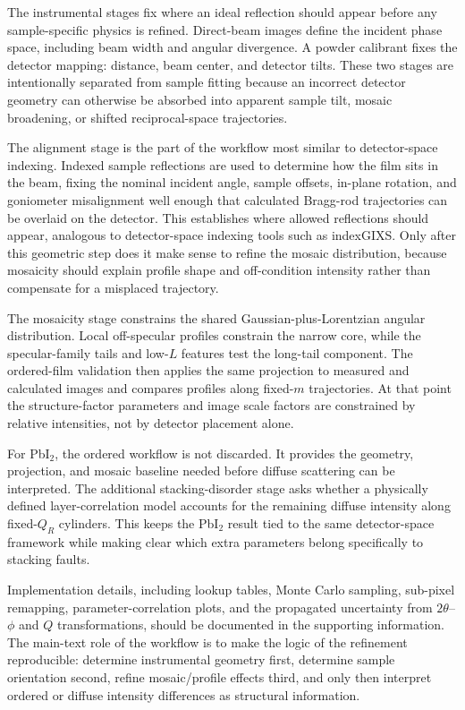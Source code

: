 The instrumental stages fix where an ideal reflection should appear before any sample-specific physics is refined. Direct-beam images define the incident phase space, including beam width and angular divergence. A powder calibrant fixes the detector mapping: distance, beam center, and detector tilts. These two stages are intentionally separated from sample fitting because an incorrect detector geometry can otherwise be absorbed into apparent sample tilt, mosaic broadening, or shifted reciprocal-space trajectories.

The alignment stage is the part of the workflow most similar to detector-space indexing. Indexed sample reflections are used to determine how the film sits in the beam, fixing the nominal incident angle, sample offsets, in-plane rotation, and goniometer misalignment well enough that calculated Bragg-rod trajectories can be overlaid on the detector. This establishes where allowed reflections should appear, analogous to detector-space indexing tools such as indexGIXS.\cite{SmilgiesLi2026IndexGIXS} Only after this geometric step does it make sense to refine the mosaic distribution, because mosaicity should explain profile shape and off-condition intensity rather than compensate for a misplaced trajectory.

The mosaicity stage constrains the shared Gaussian-plus-Lorentzian angular distribution. Local off-specular profiles constrain the narrow core, while the specular-family tails and low-$L$ features test the long-tail component. The ordered-film validation then applies the same projection to measured and calculated images and compares profiles along fixed-$m$ trajectories. At that point the structure-factor parameters and image scale factors are constrained by relative intensities, not by detector placement alone.

For PbI$_2$, the ordered workflow is not discarded. It provides the geometry, projection, and mosaic baseline needed before diffuse scattering can be interpreted. The additional stacking-disorder stage asks whether a physically defined layer-correlation model accounts for the remaining diffuse intensity along fixed-$Q_R$ cylinders. This keeps the PbI$_2$ result tied to the same detector-space framework while making clear which extra parameters belong specifically to stacking faults.

Implementation details, including lookup tables, Monte Carlo sampling, sub-pixel remapping, parameter-correlation plots, and the propagated uncertainty from $2\theta$--$\phi$ and $Q$ transformations, should be documented in the supporting information. The main-text role of the workflow is to make the logic of the refinement reproducible: determine instrumental geometry first, determine sample orientation second, refine mosaic/profile effects third, and only then interpret ordered or diffuse intensity differences as structural information.

